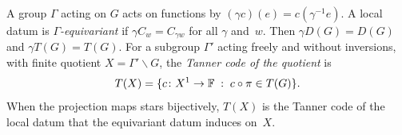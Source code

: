 A group $\Gamma$ acting on $G$ acts on functions by $(\gamma c)(e)=c(\gamma^{-1}e)$. A local datum is
\emph{$\Gamma$-equivariant} if $\gamma C_w=C_{\gamma w}$ for all $\gamma$ and~$w$. Then $\gamma D(G)=D(G)$ and
$\gamma T(G)=T(G)$. For a subgroup $\Gamma'$ acting freely and without inversions, with finite quotient
$X=\Gamma'\backslash G$, the \emph{Tanner code of the quotient} is
\[
  T(X)=\{c\colon X^1\to\mathbb{F} \;:\; c\circ\pi\in T(G)\}.
\]
When the projection maps stars bijectively, $T(X)$ is the Tanner code of the local datum that the equivariant datum
induces on~$X$.
